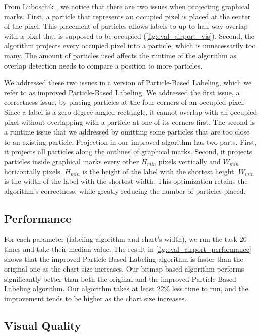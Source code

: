 From Luboschik \ea \cite{luboschik:particle}, we notice that there are two issues when projecting graphical marks.
First, a particle that represents an occupied pixel is placed at the center of the pixel.
This placement of particles allows labels to up to half-way overlap with a pixel that is supposed to be occupied (\autoref{fig:eval_airport_vis}).
Second, the algorithm projects every occupied pixel into a particle, which is unnecessarily too many.
The amount of particles used affects the runtime of the algorithm as overlap detection needs to compare a position to more particles.

We addressed these two issues in a version of Particle-Based Labeling, which we refer to as improved Particle-Based Labeling.
We addressed the first issue, a correctness issue, by placing particles at the four corners of an occupied pixel.
Since a label is a zero-degree-angled rectangle, it cannot overlap with an occupied pixel without overlapping with a particle at one of its corners first.
The second is a runtime issue that we addressed by omitting some particles that are too close to an existing particle.
Projection in our improved algorithm has two parts.
First, it projects all particles along the outlines of graphical marks.
Second, it projects particles inside graphical marks every other $H_{min}$ pixels vertically and $W_{min}$ horizontally pixels.
$H_{min}$ is the height of the label with the shortest height.
$W_{min}$ is the width of the label with the shortest width.
This optimization retains the algorithm's correctness, while greatly reducing the number of particles placed.

\subsection{Performance}

For each parameter (labeling algorithm and chart's width), we run the task 20 times and take their median value.
The result in \autoref{fig:eval_airport_performance} shows that
the improved Particle-Based Labeling algorithm is faster than the original one as the chart size increases.
Our bitmap-based algorithm performs significantly better than both the original and the improved Particle-Based Labeling algorithm.
Our algorithm takes at least 22\% less time to run, and the improvement tends to be higher as the chart size increases.

\subsection{Visual Quality}


